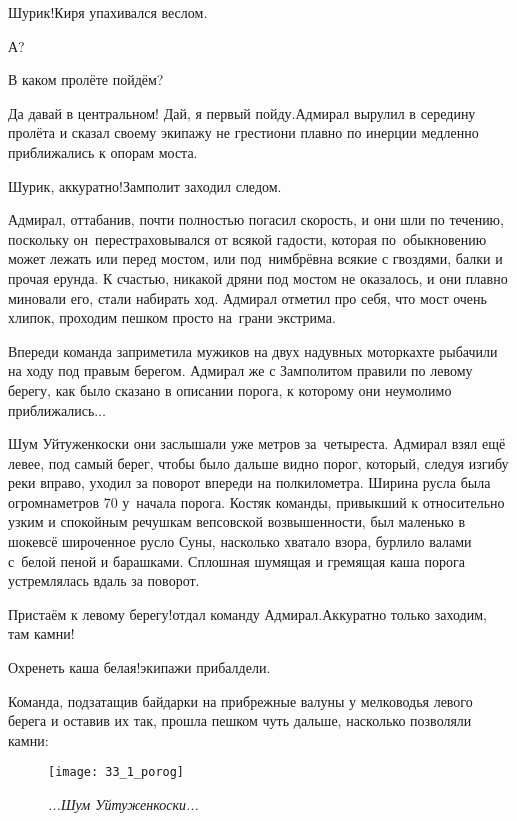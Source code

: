 \diagdash Шурик!\mdash Киря упахивался веслом.

\diagdash А?

\diagdash В каком пролёте пойдём?

\diagdash Да давай в центральном! Дай, я первый пойду.\mdash Адмирал вырулил в середину пролёта и сказал своему экипажу не грести\mdash они плавно по инерции медленно приближались к опорам моста. 

\diagdash Шурик, аккуратно!\mdash Замполит заходил следом.

Адмирал, оттабанив, почти полностью погасил скорость, и они шли по течению, поскольку он~перестраховывался от всякой гадости, которая по~обыкновению может лежать или перед мостом, или под~ним\mdash брёвна всякие с гвоздями, балки и прочая ерунда. К счастью, никакой дряни под мостом не оказалось, и они плавно миновали его, стали набирать ход. Адмирал отметил про себя, что мост очень хлипок, проходим пешком просто на~грани экстрима.

Впереди команда заприметила мужиков на двух надувных моторках\mdash те рыбачили на ходу под правым берегом. Адмирал же с Замполитом правили по левому берегу, как было сказано в описании порога, к которому они неумолимо приближались$\dots$ 

Шум Уйтуженкоски они заслышали уже метров за~четыреста. Адмирал взял ещё левее, под самый берег, чтобы было дальше видно порог, который, следуя изгибу реки вправо, уходил за поворот впереди на полкилометра. Ширина русла была огромна\mdash метров 70 у~начала порога. Костяк команды, привыкший к относительно узким и спокойным речушкам вепсовской возвышенности, был маленько в шоке\mdash всё широченное русло Суны, насколько хватало взора, бурлило валами с~белой пеной и барашками. Сплошная шумящая и гремящая каша порога устремлялась вдаль за поворот.

\diagdash Пристаём к левому берегу!\mdash отдал команду Адмирал.\mdash Аккуратно только заходим, там камни!

\diagdash Охренеть каша белая!\mdash экипажи прибалдели.

Команда, подзатащив байдарки на прибрежные валуны у мелководья левого берега и оставив их так, прошла пешком чуть дальше, насколько позволяли камни:

\begin{figure}[h]
	\centering
	\texttt{[image: 33\_1\_porog]}
	\caption{\small\textit{...Шум Уйтуженкоски...}}
\end{figure}

